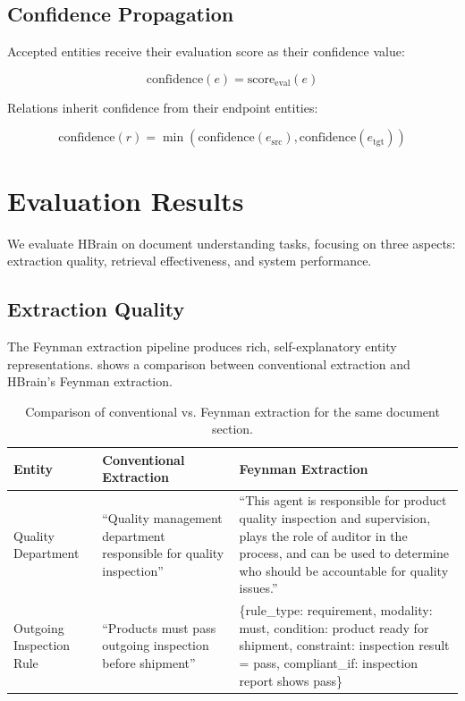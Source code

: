 \documentclass[11pt]{article}
\begin{document}
\subsection{Confidence Propagation}

Accepted entities receive their evaluation score as their confidence value:

\begin{equation}
\text{confidence}(e) = \text{score}_{\text{eval}}(e)
\end{equation}

Relations inherit confidence from their endpoint entities:

\begin{equation}
\text{confidence}(r) = \min(\text{confidence}(e_{\text{src}}), \text{confidence}(e_{\text{tgt}}))
\end{equation}

\section{Evaluation Results}
\label{sec:results}

We evaluate HBrain on document understanding tasks, focusing on three aspects: extraction quality, retrieval effectiveness, and system performance.

\subsection{Extraction Quality}

The Feynman extraction pipeline produces rich, self-explanatory entity representations.  shows a comparison between conventional extraction and HBrain's Feynman extraction.

\begin{table}[htbp]
\centering
\caption{Comparison of conventional vs. Feynman extraction for the same document section.}
\label{tab:extraction-example}
\begin{tabular}{@{}p{2.5cm}p{5.5cm}p{5.5cm}@{}}
\toprule
\textbf{Entity} & \textbf{Conventional Extraction} & \textbf{Feynman Extraction} \\
\midrule
Quality Department & ``Quality management department responsible for quality inspection'' & ``This agent is responsible for product quality inspection and supervision, plays the role of auditor in the process, and can be used to determine who should be accountable for quality issues.'' \\
\midrule
Outgoing Inspection Rule & ``Products must pass outgoing inspection before shipment'' & \{rule\_type: requirement, modality: must, condition: product ready for shipment, constraint: inspection result = pass, compliant\_if: inspection report shows pass\} \\
\bottomrule
\end{tabular}
\end{table}
\end{document}
